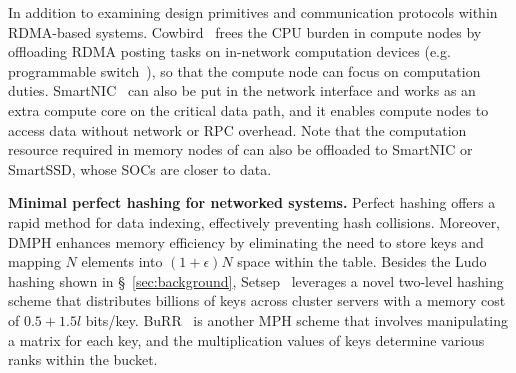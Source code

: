 
In addition to examining design primitives and communication protocols within RDMA-based systems.
Cowbird~\cite{cowbird} frees the CPU burden in compute nodes by offloading RDMA posting tasks on in-network computation devices (e.g. programmable switch~\cite{netcache}), so that the compute node can focus on computation duties. 
SmartNIC~\cite{smartnic1,smartnic2,prism,strom} can also be put in the network interface and works as an extra compute core on the critical data path, and it enables compute nodes to access data without network or RPC overhead. 
Note that the computation resource required in memory nodes of \sys can also be offloaded to SmartNIC or SmartSSD, whose SOCs are closer to data. 

\textbf{Minimal perfect hashing for networked systems.} 
Perfect hashing offers a rapid method for data indexing, effectively preventing hash collisions. Moreover, DMPH enhances memory efficiency by eliminating the need to store keys and mapping $N$ elements into $(1+\epsilon)N$ space within the table.
Besides the Ludo hashing shown in \S ~\ref{sec:background}, Setsep~\cite{scalebricks} leverages a novel two-level hashing scheme that distributes billions of keys across cluster servers with a memory cost of $0.5+1.5l$ bits/key. 
BuRR~\cite{burr} is another MPH scheme that involves manipulating a matrix for each key, and the multiplication values of keys determine various ranks within the bucket.
